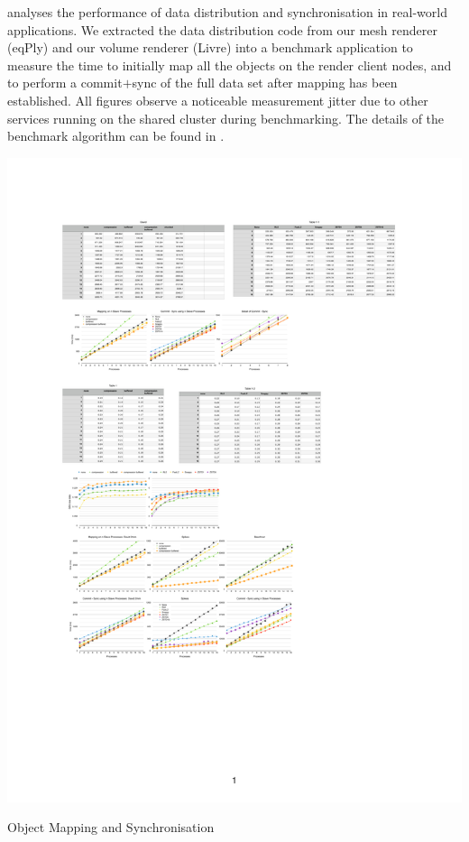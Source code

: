  analyses the performance of data distribution and
synchronisation in real-world applications. We extracted the data distribution
code from our mesh renderer (eqPly) and our volume renderer (Livre) into a
benchmark application to measure the time to initially map all the objects on
the render client nodes, and to perform a commit$+$sync of the full data set
after mapping has been established. All figures observe a noticeable
measurement jitter due to other services running on the shared cluster during
benchmarking. The details of the benchmark algorithm can be found in
\cite{ESP:18}.

\begin{benchmark}[h!t]\center
  \includegraphics[width=\textwidth]{results/mapping}
  \caption{\label{rMapping}Object Mapping and Synchronisation}
\end{benchmark}

